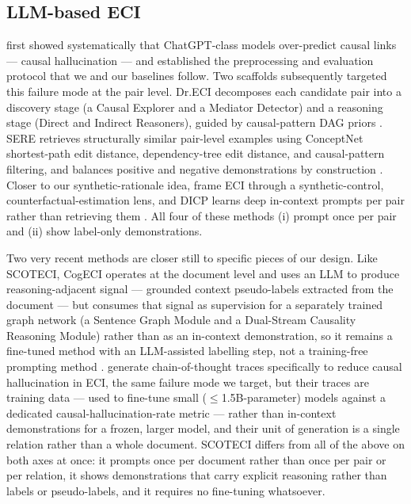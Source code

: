 \documentclass[11pt]{article}
\newcommand{\method}{SCOTECI}
\begin{document}
\subsection{LLM-based ECI}
\citet{gao2023chatgpt} first showed systematically that ChatGPT-class models
over-predict causal links --- causal hallucination --- and established the
preprocessing and evaluation protocol that we and our baselines follow. Two
scaffolds subsequently targeted this failure mode at the pair level. Dr.ECI
decomposes each candidate pair into a discovery stage (a Causal Explorer and a
Mediator Detector) and a reasoning stage (Direct and Indirect Reasoners), guided by
causal-pattern DAG priors \citep{cai2025dreci}. SERE retrieves structurally similar
pair-level examples using ConceptNet shortest-path edit distance, dependency-tree
edit distance, and causal-pattern filtering, and balances positive and negative
demonstrations by construction \citep{hao2026sere}. Closer to our synthetic-rationale
idea, \citet{wang2024synthetic} frame ECI through a synthetic-control,
counterfactual-estimation lens, and DICP learns deep in-context prompts per pair
rather than retrieving them \citep{mu2025dicp}. All four of these methods (i)
prompt once per pair and (ii) show label-only demonstrations.

Two very recent methods are closer still to specific pieces of our design. Like
\method{}, CogECI operates at the document level and uses an LLM to produce
reasoning-adjacent signal --- grounded context pseudo-labels extracted from the
document --- but consumes that signal as supervision for a separately trained
graph network (a Sentence Graph Module and a Dual-Stream Causality Reasoning
Module) rather than as an in-context demonstration, so it remains a fine-tuned
method with an LLM-assisted labelling step, not a training-free prompting method
\citep{zhang2026cogeci}. \citet{zhao2026cottraces} generate chain-of-thought
traces specifically to reduce causal hallucination in ECI, the same failure mode
we target, but their traces are training data --- used to fine-tune small
($\leq$1.5B-parameter) models against a dedicated causal-hallucination-rate metric
--- rather than in-context demonstrations for a frozen, larger model, and their
unit of generation is a single relation rather than a whole document. \method{}
differs from all of the above on both axes at once: it prompts once per document
rather than once per pair or per relation, it shows demonstrations that carry
explicit reasoning rather than labels or pseudo-labels, and it requires no
fine-tuning whatsoever.
\end{document}

